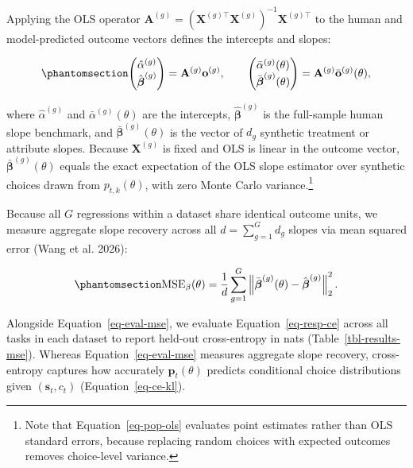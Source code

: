 \documentclass[
  11pt,
  letterpaper,
]{article}
\begin{document}
Applying the OLS operator
\(\mathbf{A}^{(g)} = (\mathbf{X}^{(g)\top}\mathbf{X}^{(g)})^{-1}\mathbf{X}^{(g)\top}\)
to the human and model-predicted outcome vectors defines the intercepts
and slopes:

\begin{equation}\protect\phantomsection\label{eq-pop-ols}{
\begin{pmatrix}
\hat{\alpha}^{(g)} \\
\hat{\boldsymbol{\beta}}^{(g)}
\end{pmatrix}
= \mathbf{A}^{(g)}\mathbf{o}^{(g)},
\qquad
\begin{pmatrix}
\bar{\alpha}^{(g)}(\theta) \\
\bar{\boldsymbol{\beta}}^{(g)}(\theta)
\end{pmatrix}
= \mathbf{A}^{(g)}\bar{\mathbf{o}}^{(g)}(\theta),
}\end{equation}

where \(\hat{\alpha}^{(g)}\) and \(\bar{\alpha}^{(g)}(\theta)\) are the
intercepts, \(\hat{\boldsymbol{\beta}}^{(g)}\) is the full-sample human
slope benchmark, and \(\bar{\boldsymbol{\beta}}^{(g)}(\theta)\) is the
vector of \(d_g\) synthetic treatment or attribute slopes. Because
\(\mathbf{X}^{(g)}\) is fixed and OLS is linear in the outcome vector,
\(\bar{\boldsymbol{\beta}}^{(g)}(\theta)\) equals the exact expectation
of the OLS slope estimator over synthetic choices drawn from
\(p_{t,k}(\theta)\), with zero Monte Carlo variance.\footnote{Note that
  Equation~\ref{eq-pop-ols} evaluates point estimates rather than OLS
  standard errors, because replacing random choices with expected
  outcomes removes choice-level variance.}

Because all \(G\) regressions within a dataset share identical outcome
units, we measure aggregate slope recovery across all
\(d = \sum_{g=1}^G d_g\) slopes via mean squared error (Wang et al.
2026):

\begin{equation}\protect\phantomsection\label{eq-eval-mse}{
\mathrm{MSE}_{\beta}(\theta) = \frac{1}{d} \sum_{g=1}^G \left\lVert \bar{\boldsymbol{\beta}}^{(g)}(\theta) - \hat{\boldsymbol{\beta}}^{(g)} \right\rVert_2^2.
}\end{equation}

Alongside Equation~\ref{eq-eval-mse}, we evaluate
Equation~\ref{eq-resp-ce} across all tasks in each dataset to report
held-out cross-entropy in nats (Table~\ref{tbl-results-mse}). Whereas
Equation~\ref{eq-eval-mse} measures aggregate slope recovery,
cross-entropy captures how accurately \(\mathbf{p}_t(\theta)\) predicts
conditional choice distributions given \((\mathbf{s}_t, c_t)\)
(Equation~\ref{eq-ce-kl}).
\end{document}
